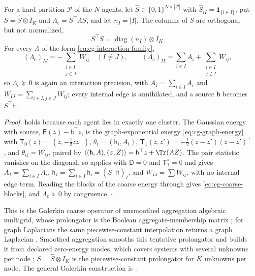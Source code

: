 For a hard partition \(\mathcal P\) of the \(N\) agents, let
\(\widehat S\in\{0,1\}^{N\times|\mathcal P|}\) with
\(\widehat S_{iI}=\mathbf 1_{\{i\in I\}}\), put
\(S=\widehat S\otimes I_K\) and \(\Lambda_{\mathrm c}=S^\top\Lambda S\), and let
\(n_I=|I|\). The columns of \(S\) are orthogonal but not normalized,
\begin{equation}
S^\top S=\operatorname{diag}(n_I)\otimes I_K .
\label{eq:cg-aggregation-matrix}
\end{equation}
For every \(\Lambda\) of the form \eqref{eq:cg-interaction-family},
\begin{equation}
(\Lambda_{\mathrm c})_{IJ}
=-\sum_{\substack{i\in I\\j\in J}}W_{ij}\quad(I\neq J),
\qquad
(\Lambda_{\mathrm c})_{II}
=\sum_{i\in I}A_i
+\sum_{\substack{i\in I\\j\notin I}}W_{ij},
\label{eq:cg-coarse-blocks}
\end{equation}
so \(\Lambda_{\mathrm c}\succeq0\) is again an interaction precision, with
\(A_I=\sum_{i\in I}A_i\) and \(W_{IJ}=\sum_{i\in I,j\in J}W_{ij}\); every
internal edge is annihilated, and a source \(\mathsf h\) becomes
\(S^\top\mathsf h\). 

\noindent\emph{Proof.}
 holds because each agent lies in exactly one
cluster. The Gaussian energy with source,
\(\mathsf E(z)-\mathsf h^\top z\), is the graph-exponential energy
\eqref{eq:cg-graph-energy} with \(\mathsf T_0(z)=(z,-\tfrac12zz^\top)\),
\(\theta_i=(\mathsf h_i,A_i)\), \(\mathsf T_1(z,z')=-\tfrac12(z-z')(z-z')^\top\), and
\(\theta_{ij}=W_{ij}\), paired by \(\langle(\mathsf h,A),(z,Z)\rangle
=\mathsf h^\top z+\Tr(AZ)\). The pair statistic vanishes on the diagonal, so
 applies with \(\mathsf D=0\) and
\(\mathsf T_1^\circ=0\) and gives \(A_I=\sum_{i\in I}A_i\),
\(\mathsf h_I=\sum_{i\in I}\mathsf h_i=(S^\top\mathsf h)_I\), and
\(W_{IJ}=\sum W_{ij}\), with no internal-edge term. Reading the blocks of the
coarse energy through  gives
\eqref{eq:cg-coarse-blocks}, and \(\Lambda_{\mathrm c}\succeq0\) by
congruence. \(\square\)

This is the Galerkin coarse operator of unsmoothed aggregation algebraic
multigrid, whose prolongator is the Boolean aggregate-membership matrix
\citep[Eqs.~(2.1)--(2.2)]{Notay2010Aggregation}; for graph Laplacians the same
piecewise-constant interpolation returns a graph Laplacian
\citep[Sec.~2]{LivneBrandt2012LAMG}. Smoothed aggregation smooths this
tentative prolongator and builds it from declared zero-energy modes, which
covers systems with several unknowns per node \citep{VanekMandelBrezina1996};
\(S=\widehat S\otimes I_K\) is the piecewise-constant prolongator for \(K\)
unknowns per node. The general Galerkin construction is
.

